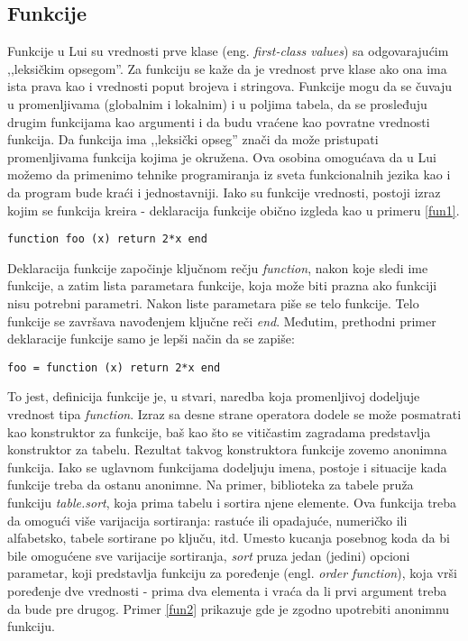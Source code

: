 \documentclass[a4paper]{article}
\begin{document}


\subsection{Funkcije}
\label{sec:funkcije}

Funkcije u Lui su vrednosti prve klase (eng. \textit{first-class values}) sa odgovarajućim ,,leksičkim opsegom''. Za funkciju se kaže da je vrednost prve klase ako ona ima ista prava kao i vrednosti poput brojeva i stringova. Funkcije mogu da se čuvaju u promenljivama (globalnim i lokalnim) i u poljima tabela, da se prosleđuju drugim funkcijama kao argumenti i da budu vraćene kao povratne vrednosti funkcija. Da funkcija ima ,,leksički opseg'' znači da može pristupati promenljivama funkcija kojima je okružena. Ova osobina omogućava da u Lui možemo da primenimo tehnike programiranja iz sveta funkcionalnih jezika kao i da program bude kraći i jednostavniji. Iako su funkcije vrednosti, postoji izraz kojim se funkcija kreira - deklaracija funkcije obično izgleda kao u primeru \ref{fun1}.
\begin{lstlisting}[caption={Deklaracija funkcije \cite{bookProgInLua}},frame=single, label=fun1]
    function foo (x) return 2*x end
\end{lstlisting}
Deklaracija funkcije započinje ključnom rečju \textit{function}, nakon koje sledi ime funkcije, a zatim lista parametara funkcije, koja može biti prazna ako funkciji nisu potrebni parametri. Nakon liste parametara piše se telo funkcije. Telo funkcije se završava navođenjem ključne reči \textit{end}.
Međutim, prethodni primer deklaracije funkcije samo je lepši način da se zapiše:
\begin{lstlisting}[caption={Dodela vrednosti tipa \textit{function} promenljivoj foo \cite{bookProgInLua}},frame=single, label=fun1]
    foo = function (x) return 2*x end
\end{lstlisting}
To jest, definicija funkcije je, u stvari, naredba koja promenljivoj dodeljuje vrednost tipa \textit{function}. Izraz sa desne strane operatora dodele se može posmatrati kao konstruktor za funkcije, baš kao što se vitičastim zagradama predstavlja konstruktor za tabelu. Rezultat takvog konstruktora funkcije zovemo anonimna funkcija. Iako se uglavnom funkcijama dodeljuju imena, postoje i situacije kada funkcije treba da ostanu anonimne. Na primer, biblioteka za tabele pruža funkciju \textit{table.sort}, koja prima tabelu i sortira njene elemente. Ova funkcija treba da omogući više varijacija sortiranja: rastuće ili opadajuće, numeričko ili alfabetsko, tabele sortirane po ključu, itd. Umesto kucanja posebnog koda da bi bile omogućene sve varijacije sortiranja, \textit{sort} pruza jedan (jedini) opcioni parametar, koji predstavlja funkciju za poređenje (engl. \textit{order function}), koja vrši poređenje dve vrednosti - prima dva elementa i vraća da li prvi argument treba da bude pre drugog. Primer \ref{fun2} prikazuje gde je zgodno upotrebiti anonimnu funkciju.
\end{document}
